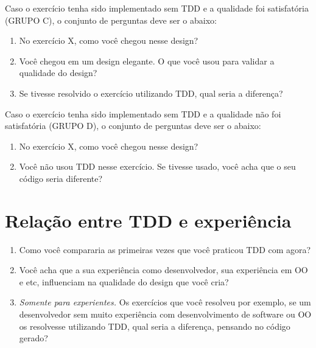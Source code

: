 Caso o exercício tenha sido implementado sem TDD e a qualidade foi satisfatória (GRUPO C),
o conjunto de perguntas deve ser o abaixo:

\begin{enumerate}
	
	\item No exercício X, como você chegou nesse design?
	
	\item Você chegou em um design elegante. O que você usou para validar a qualidade do design?
	
	\item Se tivesse resolvido o exercício utilizando TDD, qual seria a diferença?
	
\end{enumerate}

Caso o exercício tenha sido implementado sem TDD e a qualidade não foi satisfatória (GRUPO D),
o conjunto de perguntas deve ser o abaixo:

\begin{enumerate}
	
	\item No exercício X, como você chegou nesse design?
	
	\item Você não usou TDD nesse exercício. Se tivesse usado, você acha que o seu código seria diferente?
	
\end{enumerate}

\section{Relação entre TDD e experiência}

\begin{enumerate}
	\item Como você compararia as primeiras vezes que você praticou TDD com agora?

	\item Você acha que a sua experiência como desenvolvedor, sua experiência em OO e etc,
	influenciam na qualidade do design que você cria?

	\item \textit{Somente para experientes.} Os exercícios que você resolveu por exemplo, se um desenvolvedor
	sem muito experiência com desenvolvimento de software ou OO os resolvesse utilizando TDD, qual seria a diferença,
	pensando no código gerado?

\end{enumerate}

